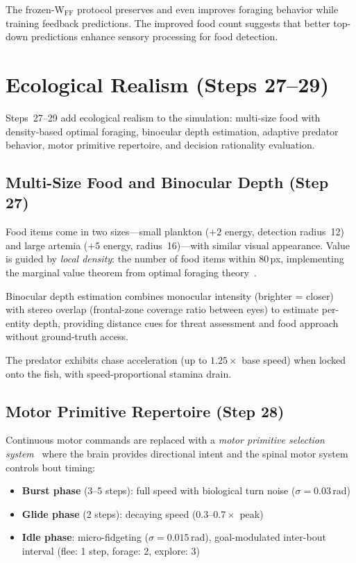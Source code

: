 \documentclass[11pt,a4paper]{article}
\begin{document}
The frozen-W$_\text{FF}$ protocol preserves and even improves foraging
behavior while training feedback predictions.  The improved food count
suggests that better top-down predictions enhance sensory processing
for food detection.

\section{Ecological Realism (Steps 27--29)}\label{sec:ecological}

Steps~27--29 add ecological realism to the simulation: multi-size food
with density-based optimal foraging, binocular depth estimation,
adaptive predator behavior, motor primitive repertoire, and decision
rationality evaluation.

\subsection{Multi-Size Food and Binocular Depth (Step 27)}

Food items come in two sizes---small plankton ($+2$ energy, detection
radius~12) and large artemia ($+5$ energy, radius~16)---with similar
visual appearance.  Value is guided by \emph{local density}: the number
of food items within 80\,px, implementing the marginal value theorem
from optimal foraging theory~\cite{charnov1976}.

Binocular depth estimation combines monocular intensity (brighter =
closer) with stereo overlap (frontal-zone coverage ratio between eyes)
to estimate per-entity depth, providing distance cues for threat
assessment and food approach without ground-truth access.

The predator exhibits chase acceleration (up to $1.25\times$ base speed)
when locked onto the fish, with speed-proportional stamina drain.

\subsection{Motor Primitive Repertoire (Step 28)}\label{sec:motor_primitives}

Continuous motor commands are replaced with a \emph{motor primitive
selection system}~\cite{marques2018} where the brain provides
directional intent and the spinal motor system controls bout timing:

\begin{itemize}[nosep]
  \item \textbf{Burst phase} (3--5 steps): full speed with biological
    turn noise ($\sigma = 0.03$\,rad)
  \item \textbf{Glide phase} (2 steps): decaying speed
    ($0.3$--$0.7\times$ peak)
  \item \textbf{Idle phase}: micro-fidgeting ($\sigma = 0.015$\,rad),
    goal-modulated inter-bout interval (flee: 1 step, forage: 2,
    explore: 3)
\end{itemize}
\end{document}
